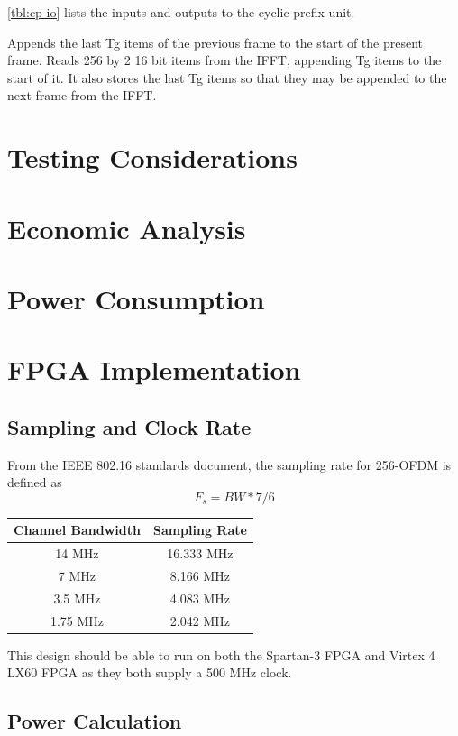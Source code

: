 \documentclass[dvips,10pt,twocolumn]{article}
\begin{document}
\autoref{tbl:cp-io} lists the inputs and outputs to the cyclic
prefix unit.

Appends the last Tg items of the previous frame to the start of the
present frame.  Reads 256 by 2 16 bit items from the IFFT, appending Tg
items to the start of it. It also stores the last Tg items so that
they may be appended to the next frame from the IFFT.


\section{Testing Considerations}
\section{Economic Analysis}
\section{Power Consumption}
\section{FPGA Implementation}
  \subsection{Sampling and Clock Rate}
    From the IEEE 802.16 standards document, the sampling rate for
    256-OFDM is defined as
    \begin{equation}
    F_s = BW * 7/6
    \end{equation}
  
  \begin{center}
  \begin{tabular}{c|c}
  Channel Bandwidth & Sampling Rate \\ \hline
  14 MHz & 16.333 MHz \\
  7 MHz & 8.166 MHz \\
  3.5 MHz & 4.083 MHz \\
  1.75 MHz & 2.042 MHz
  \end{tabular}
  \end{center}
  
  This design should be able to run on both the Spartan-3 FPGA and Virtex 4 LX60
  FPGA as they both supply a 500 MHz clock.
  
  \subsection{Power Calculation}
  
\end{document}
